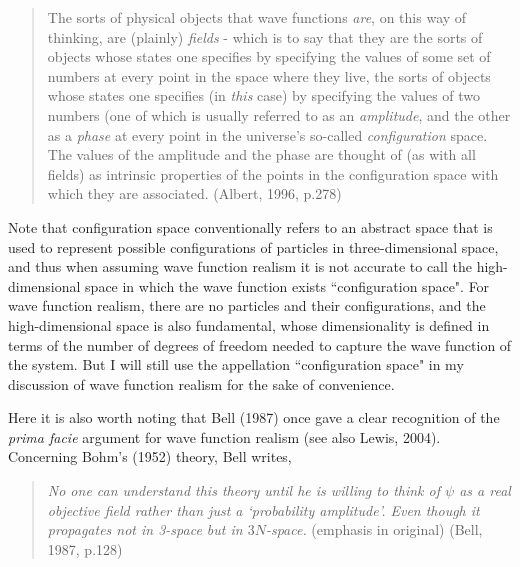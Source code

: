 \begin{quote}
The sorts of physical objects that wave functions \emph{are}, on this way of thinking, are (plainly) \emph{fields} - which is to say that they are the sorts of objects whose states one specifies by specifying the values of some set of numbers at every point in the space where they live, the sorts of objects whose states one specifies (in \emph{this} case) by specifying the values of two numbers (one of which is usually referred to as an \emph{amplitude}, and the other as a \emph{phase} at every point in the universe's so-called \emph{configuration} space. \\
\indent The values of the amplitude and the phase are thought of (as with all fields) as intrinsic properties of the points in the configuration space with which they are associated. (Albert, 1996, p.278)
\end{quote}

\noindent Note that configuration space conventionally refers to an abstract space that is used to represent possible configurations of particles in three-dimensional space, and thus when assuming wave function realism 
it is not accurate to call the high-dimensional space in which the wave function exists ``configuration space".  For wave function realism, there are no particles and their configurations, and the high-dimensional space is also fundamental, whose dimensionality is defined in terms of the number of degrees of freedom needed to capture the wave function of the system. But I will still use the appellation ``configuration space" in my discussion of wave function realism for the sake of  convenience.
 
Here it is also worth noting that Bell (1987) once gave a clear recognition of  the \emph{prima facie} argument for wave function realism (see also Lewis, 2004). Concerning Bohm's (1952) theory, Bell writes,%

\begin{quote}
\emph{No one can understand this theory until he is willing to think of $\psi$ as a real objective field rather than just a `probability amplitude'. Even though it propagates not in 3-space but in $3N$-space.} (emphasis in original) (Bell, 1987, p.128) %
\end{quote}


